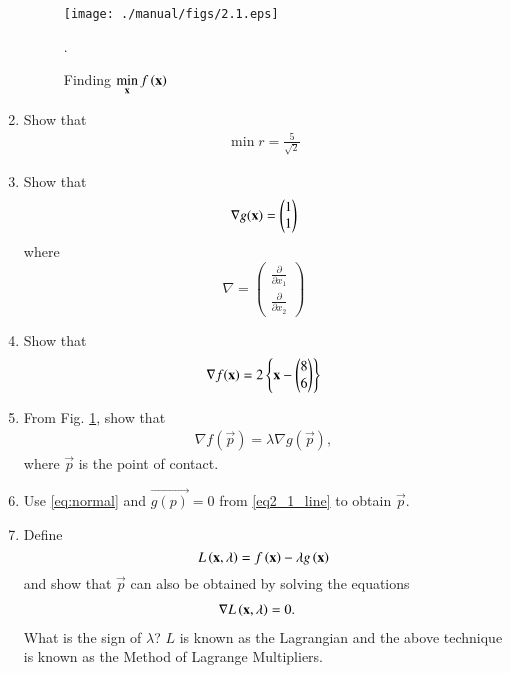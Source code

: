 \documentclass[journal,12pt,twocolumn]{IEEEtran}
\renewcommand\thesection{\arabic{section}}
\begin{document}
\begin{enumerate}[label=\thesection.\arabic*,ref=\thesection.\theenumi]
%
\begin{figure}[!ht]
\centering
\texttt{[image: ./manual/figs/2.1.eps]}
\caption{ Finding $ \displaystyle \min_{\mathbf{x}}f\left(\mathbf{x}\right)$}.
\label{fig.2.1}	
\end{figure}
%
\item Show that 
\begin{align}
\min r = \frac{5}{\sqrt{2}}
\end{align}
%
\item Show that 
\begin{align}
\nabla g(\mathbf{x}) = \begin{pmatrix}1 \\ 1\end{pmatrix}
\end{align}
where
\begin{equation}
\nabla =  
\begin{pmatrix}
\frac{\partial}{\partial x_1} \\
\frac{\partial}{\partial x_2} 
\end{pmatrix}
\end{equation}

\item Show that 
\begin{align}
\nabla f(\mathbf{x}) = 2\left\{\mathbf{x}-\begin{pmatrix}8 \\ 6\end{pmatrix}\right\}
\end{align}
\item From Fig. \ref{fig.2.1}, show that 
\begin{align}
\label{eq:normal}
\nabla f(\vec{p}) = \lambda \nabla g(\vec{p}),
\end{align}
%
where $\vec{p}$ is the point of contact.
\item Use \eqref{eq:normal} and $\vec{g(p)}=0$ from \eqref{eq2_1_line} to obtain $\vec{p}$.
\item
\label{lagrange}
	Define 
	\begin{equation}
	\label{lagrangian}
	L\brak{\mbf{x},\lambda} = f\brak{\mbf{x}} - \lambda g\brak{\mbf{x}}%
	\end{equation}
and show that $\vec{p}$ can also be obtained by 
solving the equations
%
\begin{align}
\nabla L\brak{\mbf{x},\lambda} &= 0.
\label{tangent}
\end{align}
%
What is the sign of $\lambda$?  $L$ is known as the Lagrangian and the above technique is known as the Method of Lagrange Multipliers.


\end{enumerate}
\end{document}
